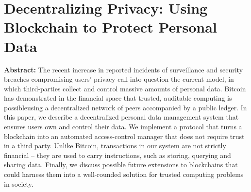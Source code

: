 \section{Decentralizing Privacy: Using Blockchain to Protect Personal Data }

\textbf{Abstract:} 
The recent increase in reported incidents of surveillance and security breaches compromising users’ privacy call into question the current model, in which third-parties collect and control massive amounts of personal data. Bitcoin has demonstrated in the financial space that trusted, auditable computing is possibleusing a decentralized network of peers accompanied by a public ledger.  In  this  paper,  we  describe  a  decentralized  personal  data management  system  that  ensures  users  own  and  control  their data.  We  implement  a  protocol  that  turns  a  blockchain  into  an automated access-control manager that does not require trust in a third party. Unlike Bitcoin, transactions in our system are not strictly  financial  –  they  are  used  to  carry  instructions,  such  as storing,  querying  and  sharing  data.  Finally,  we  discuss  possible future  extensions  to  blockchains  that  could  harness  them  into  a well-rounded solution for trusted computing problems in society.
